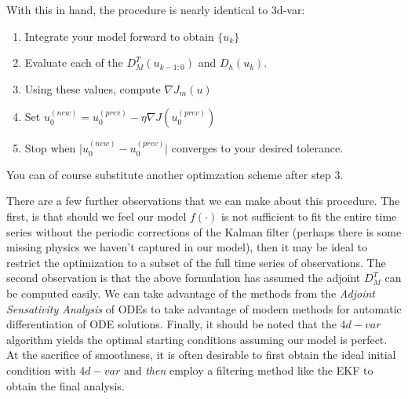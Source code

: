 With this in hand, the procedure is nearly identical to 3d-var:
\begin{enumerate}
\item Integrate your model forward to obtain $\{u_k\}$
\item Evaluate each of the $D_M^T(u_{k-1:0})$ and $D_h(u_k)$.
\item Using these values, compute $\nabla J_m(u)$
\item Set $u_0^{(new)} = u_0^{(prev)} - \eta \nabla J(u_0^{(prev)})$
\item Stop when $\lvert u_0^{(new)} - u_0^{(prev)} \rvert$ converges to your desired tolerance.
\end{enumerate}
You can of course substitute another optimzation scheme after step 3.

There are a few further observations that we can make about this procedure. The first, is that should we feel our model $f(\cdot)$ is not sufficient to fit the entire time series without the periodic corrections of the Kalman filter (perhaps there is some missing physics we haven't captured in our model), then it may be ideal to restrict the optimization to a subset of the full time series of observations. The second observation is that the above formulation has assumed the adjoint $D_M^T$ can be computed easily. We can take advantage of the methods from the \textit{Adjoint Sensativity Analysis} of ODEs to take advantage of modern methods for automatic differentiation of ODE solutions. Finally, it should be noted that the $4d-var$ algorithm yields the optimal starting conditions assuming our model is perfect. At the sacrifice of smoothness, it is often desirable to first obtain the ideal initial condition with $4d-var$ and \textit{then} employ a filtering method like the EKF to obtain the final analysis.




